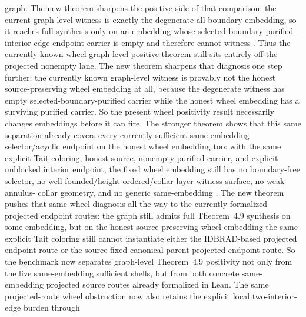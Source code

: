 \documentclass[11pt]{article}
\begin{document}
\begin{itemize}
graph.  The new theorem
sharpens the positive side of that comparison: the current graph-level
witness is exactly the degenerate all-boundary embedding, so it reaches full
synthesis only on an embedding whose selected-boundary-purified interior-edge
endpoint carrier is empty and therefore cannot witness
.  Thus the currently
known wheel graph-level positive theorem still sits entirely off the
projected nonempty lane.  The new theorem
sharpens that diagnosis one step further: the currently known graph-level
witness is provably not the honest source-preserving wheel embedding at all,
because the degenerate witness has empty selected-boundary-purified carrier
while the honest wheel embedding has a surviving purified carrier.  So the
present wheel positivity result necessarily changes embeddings before it can
fire.  The stronger theorem
shows that this same separation already covers every currently sufficient
same-embedding selector/acyclic endpoint on the honest wheel embedding too:
with the same explicit Tait coloring, honest source, nonempty purified
carrier, and explicit unblocked interior endpoint, the fixed wheel embedding
still has no boundary-free selector, no
well-founded/height-ordered/collar-layer witness surface, no weak annulus-
collar geometry, and no generic same-embedding
.  The new theorem
pushes that same wheel diagnosis all the way to the currently formalized
projected endpoint routes: the graph still admits full Theorem~4.9 synthesis
on some embedding, but on the honest source-preserving wheel embedding the
same explicit Tait coloring still cannot instantiate either the IDBRAD-based
projected endpoint route or the source-fixed canonical-parent projected
endpoint route.  So the benchmark now separates graph-level Theorem~4.9
positivity not only from the live same-embedding sufficient shells, but from
both concrete same-embedding projected source routes already formalized in
Lean.  The same projected-route wheel obstruction now also retains the
explicit local two-interior-edge burden through

\end{itemize}
\end{document}
